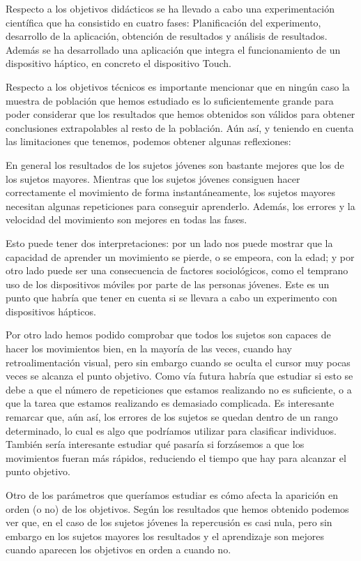 \documentclass[a4paper,11pt, oneside]{book}
\begin{document}
Respecto a los objetivos didácticos se ha llevado a cabo una experimentación científica que ha consistido en cuatro fases: Planificación del experimento, desarrollo de la aplicación, obtención de resultados y análisis de resultados. Además se ha desarrollado una aplicación que integra el funcionamiento de un dispositivo háptico, en concreto el dispositivo Touch.

Respecto a los objetivos técnicos es importante mencionar que en ningún caso la muestra de población que hemos estudiado es lo suficientemente grande para poder considerar que los resultados que hemos obtenidos son válidos para obtener conclusiones extrapolables al resto de la población. Aún así, y teniendo en cuenta las limitaciones que tenemos, podemos obtener algunas reflexiones:

En general los resultados de los sujetos jóvenes son bastante mejores que los de los sujetos mayores. Mientras que los sujetos jóvenes consiguen hacer correctamente el movimiento de forma instantáneamente, los sujetos mayores necesitan algunas repeticiones para conseguir aprenderlo. Además, los errores y la velocidad del movimiento son mejores en todas las fases.

Esto puede tener dos interpretaciones: por un lado nos puede mostrar que la capacidad de aprender un movimiento se pierde, o se empeora, con la edad; y por otro lado puede ser una consecuencia de factores sociológicos, como el temprano uso de los dispositivos móviles por parte de las personas jóvenes. Este es un punto que habría que tener en cuenta si se llevara a cabo un experimento con dispositivos hápticos.

Por otro lado hemos podido comprobar que todos los sujetos son capaces de hacer los movimientos bien, en la mayoría de las veces, cuando hay retroalimentación visual, pero sin embargo cuando se oculta el cursor muy pocas veces se alcanza el punto objetivo. Como vía futura habría que estudiar si esto se debe a que el número de repeticiones que estamos realizando no es suficiente, o a que la tarea que estamos realizando es demasiado complicada. Es interesante remarcar que, aún así, los errores de los sujetos se quedan dentro de un rango determinado, lo cual es algo que podríamos utilizar para clasificar individuos. También sería interesante estudiar qué pasaría si forzásemos a que los movimientos fueran más rápidos, reduciendo el tiempo que hay para alcanzar el punto objetivo.

Otro de los parámetros que queríamos estudiar es cómo afecta la aparición en orden (o no) de los objetivos. Según los resultados que hemos obtenido podemos ver que, en el caso de los sujetos jóvenes la repercusión es casi nula, pero sin embargo en los sujetos mayores los resultados y el aprendizaje son mejores cuando aparecen los objetivos en orden a cuando no.
\end{document}
